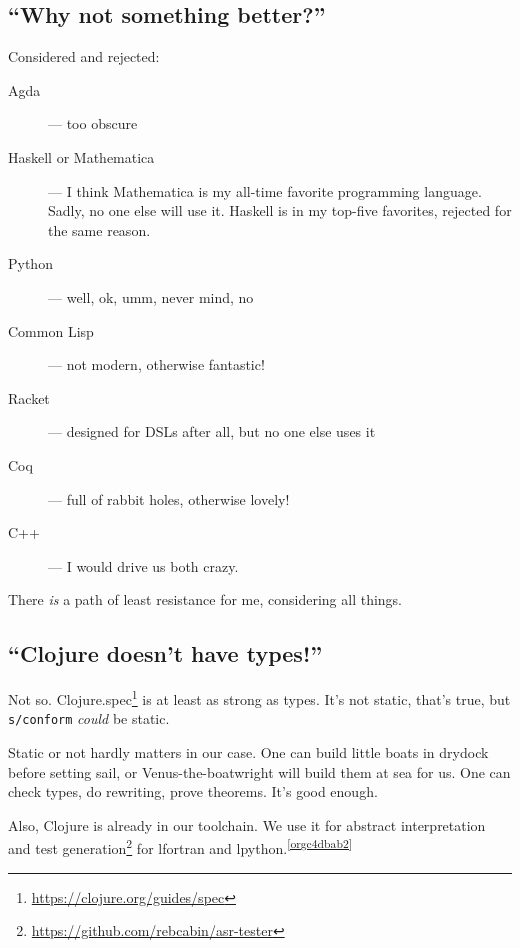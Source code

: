 \documentclass[10pt,oneside,x11names]{article}
\theoremstyle{definition}
\theoremstyle{warning}
\begin{document}
\subsection{``Why not something better?''}
\label{sec:org1f96db7}

Considered and rejected:

\begin{description}
\item[{Agda}] --- too obscure

\item[{Haskell or Mathematica}] --- I think Mathematica is my all-time
favorite programming language. Sadly, no one else will use it.
Haskell is in my top-five favorites, rejected for the same reason.

\item[{Python}] --- well, ok, umm, never mind, no

\item[{Common Lisp}] --- not modern, otherwise fantastic!

\item[{Racket}] --- designed for DSLs after all, but no one else uses it

\item[{Coq}] --- full of rabbit holes, otherwise lovely!

\item[{C++}] --- I would drive us both crazy.
\end{description}

There \emph{is} a path of least resistance for me, considering all
things.

\subsection{``Clojure doesn't have types!''}
\label{sec:org0480f31}

Not so. Clojure.spec\footnote{\url{https://clojure.org/guides/spec}} is at
least as strong as types. It's not static, that's true, but
\texttt{s/conform} \emph{could} be static.

Static or not hardly matters in our case. One can build little
boats in drydock before setting sail, or Venus-the-boatwright will
build them at sea for us. One can check types, do rewriting,
prove theorems. It's good enough.

Also, Clojure is already in our toolchain. We use it for abstract
interpretation and test generation\footnote{\url{https://github.com/rebcabin/asr-tester}}
for lfortran and lpython.\textsuperscript{\ref{orgc4dbab2}}
\end{document}

